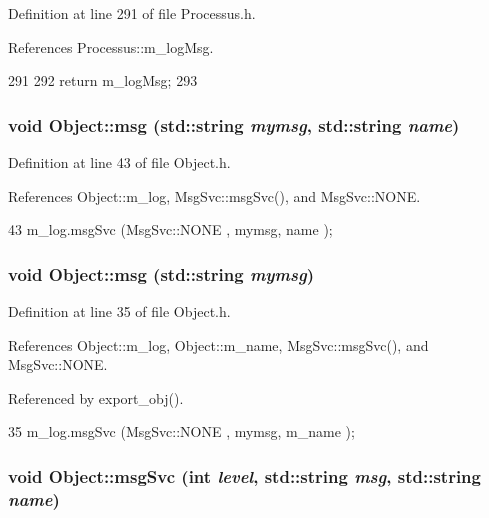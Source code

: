 Definition at line 291 of file Processus.h.

References Processus::m\_\-logMsg.


\begin{DoxyCode}
291                       {
292     return m_logMsg;
293   }
\end{DoxyCode}
\hypertarget{classObject_ac5d59299273cee27aacf7de00d2e7034}{
\subsubsection[{msg}]{\setlength{\rightskip}{0pt plus 5cm}void Object::msg (std::string {\em mymsg}, \/  std::string {\em name})}}
\label{classObject_ac5d59299273cee27aacf7de00d2e7034}


Definition at line 43 of file Object.h.

References Object::m\_\-log, MsgSvc::msgSvc(), and MsgSvc::NONE.


\begin{DoxyCode}
43 { m_log.msgSvc (MsgSvc::NONE    , mymsg, name ); }
\end{DoxyCode}
\hypertarget{classObject_a58b2d0618c2d08cf2383012611528d97}{
\subsubsection[{msg}]{\setlength{\rightskip}{0pt plus 5cm}void Object::msg (std::string {\em mymsg})}}
\label{classObject_a58b2d0618c2d08cf2383012611528d97}


Definition at line 35 of file Object.h.

References Object::m\_\-log, Object::m\_\-name, MsgSvc::msgSvc(), and MsgSvc::NONE.

Referenced by export\_\-obj().


\begin{DoxyCode}
35 { m_log.msgSvc (MsgSvc::NONE    , mymsg, m_name ); }
\end{DoxyCode}
\hypertarget{classObject_a3f9d5537ebce0c0f2bf6ae4d92426f3c}{
\subsubsection[{msgSvc}]{\setlength{\rightskip}{0pt plus 5cm}void Object::msgSvc (int {\em level}, \/  std::string {\em msg}, \/  std::string {\em name})}}
\label{classObject_a3f9d5537ebce0c0f2bf6ae4d92426f3c}


